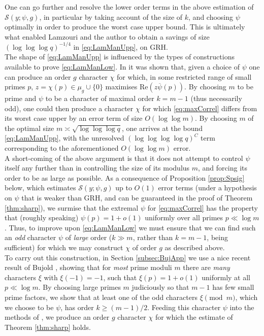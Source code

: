 \documentclass[10pt]{amsart}
\theoremstyle{definition}
\newcommand{\mc}{\mathcal}
\renewcommand{\bar}{\overline}
\begin{document}
One can go further and resolve the lower order terms in the above estimation of $\mc{S}(y;\psi,g)$, in particular by taking account of the size of $k$, and choosing $\psi$ optimally in order to produce the worst case upper bound. This is ultimately what enabled Lamzouri and the author to obtain a savings of size $(\log\log\log q)^{-1/4}$ in \eqref{eq:LamManUpp}, on GRH. \\
The shape of \eqref{eq:LamManUpp} is influenced by the types of constructions available to prove \eqref{eq:LamManLow}. In \cite[Sec. 4]{LamMan} it was shown that, given a choice of $\psi$ one can produce an order $g$ character $\chi$ for which, in some restricted range of small primes $p$, $z = \chi(p) \in \mu_g \cup \{0\}$ maximises $\text{Re}(z \bar{\psi}(p))$. By choosing $m$ to be prime and $\psi$ to be a character of maximal order $k = m-1$ (thus necessarily odd), one could then produce a character $\chi$ for which \eqref{eq:maxCorrel} differs from its worst case upper by an error term of size $O(\log\log m)$. By choosing $m$ of the optimal size  $m \asymp \sqrt{\log\log\log q}$, one arrives at the bound \eqref{eq:LamManUpp}, with the unresolved $(\log\log\log\log q)^C$ term corresponding to the aforementioned $O(\log\log m)$ error. \\
A short-coming of the above argument is that it does not attempt to control $\psi$ itself any further than in controlling the size of its modulus $m$, and forcing its order to be as large as possible. As a consequence of Proposition \ref{prop:Spsig} below, which estimates $\mc{S}(y;\psi,g)$ up to $O(1)$ error terms (under a hypothesis on $\psi$ that is weaker than GRH, and can be guaranteed in the proof of Theorem \ref{thm:sharp}), we surmise that the extremal $\psi$ for \eqref{eq:maxCorrel} has the property that (roughly speaking) $\psi(p) = 1 + o(1)$ uniformly over all primes $p \ll \log m$. Thus, to improve upon \eqref{eq:LamManLow} we must ensure that we can find such an \emph{odd} character $\psi$ of \emph{large} order ($k \gg m$, rather than $k = m-1$, being sufficient) for which we may construct $\chi$ of order $g$ as described above. \\
To carry out this construction, in Section \ref{subsec:BujApp} we use a nice recent result of Bujold \cite{Buj}, showing that for \emph{most} prime moduli $m$ there are \emph{many} characters $\xi$ with $\xi(-1) = -1$, such that $\xi(p) = 1 + o(1)$ uniformly at all $p \ll \log m$. By choosing large primes $m$ judiciously so that $m-1$ has few small prime factors, we show that at least one of the odd characters $\xi \pmod{m}$, which we choose to be $\psi$, has order $k \geq (m-1)/2$. Feeding this character $\psi$ into the methods of \cite[Sec. 4]{LamMan}, we produce an order $g$ character $\chi$ for which the estimate of Theorem \ref{thm:sharp} holds.
\end{document}
